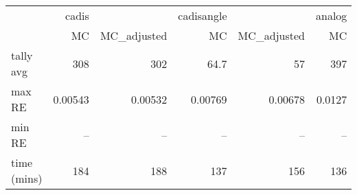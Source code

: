 \begin{tabular}{lrrrrr}
\toprule
{} &   cadis &             & cadisangle &             & analog \\
{} &      MC & MC\_adjusted &         MC & MC\_adjusted &     MC \\
\midrule
tally avg   &     308 &         302 &       64.7 &          57 &    397 \\
max RE      & 0.00543 &     0.00532 &    0.00769 &     0.00678 & 0.0127 \\
min RE      &     -- &         -- &        -- &         -- &    -- \\
time (mins) &     184 &         188 &        137 &         156 &    136 \\
\bottomrule
\end{tabular}
